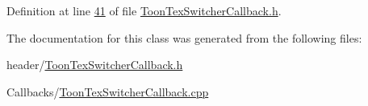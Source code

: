 Definition at line \hyperlink{_toon_tex_switcher_callback_8h_source_l00041}{41} of file \hyperlink{_toon_tex_switcher_callback_8h_source}{Toon\+Tex\+Switcher\+Callback.\+h}.



The documentation for this class was generated from the following files\+:\begin{DoxyCompactItemize}
\item 
header/\hyperlink{_toon_tex_switcher_callback_8h}{Toon\+Tex\+Switcher\+Callback.\+h}\item 
Callbacks/\hyperlink{_toon_tex_switcher_callback_8cpp}{Toon\+Tex\+Switcher\+Callback.\+cpp}\end{DoxyCompactItemize}
